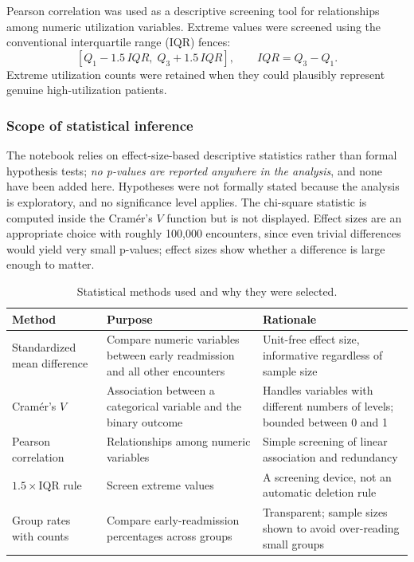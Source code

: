 \documentclass[10pt,a4paper]{article}
\begin{document}
Pearson correlation was used as a descriptive screening tool for relationships among numeric utilization variables. Extreme values were screened using the conventional interquartile range (IQR) fences:
\[
\left[Q_1-1.5\,IQR,\;Q_3+1.5\,IQR\right],
\qquad
IQR=Q_3-Q_1.
\]
Extreme utilization counts were retained when they could plausibly represent genuine high-utilization patients.

\subsubsection{Scope of statistical inference}

The notebook relies on effect-size-based descriptive statistics rather than formal hypothesis tests; \emph{no p-values are reported anywhere in the analysis}, and none have been added here. Hypotheses were not formally stated because the analysis is exploratory, and no significance level applies. The chi-square statistic is computed inside the Cramér's $V$ function but is not displayed. Effect sizes are an appropriate choice with roughly 100,000 encounters, since even trivial differences would yield very small p-values; effect sizes show whether a difference is large enough to matter.

\begin{table}[H]
\centering
\caption{Statistical methods used and why they were selected.}
\label{tab:methods}
\small
\begin{tabularx}{\textwidth}{lYY}
\toprule
Method & Purpose & Rationale\\
\midrule
Standardized mean difference & Compare numeric variables between early readmission and all other encounters & Unit-free effect size, informative regardless of sample size\\
Cramér's $V$ & Association between a categorical variable and the binary outcome & Handles variables with different numbers of levels; bounded between 0 and 1\\
Pearson correlation & Relationships among numeric variables & Simple screening of linear association and redundancy\\
$1.5\times$IQR rule & Screen extreme values & A screening device, not an automatic deletion rule\\
Group rates with counts & Compare early-readmission percentages across groups & Transparent; sample sizes shown to avoid over-reading small groups\\
\bottomrule
\end{tabularx}
\end{table}
\end{document}
